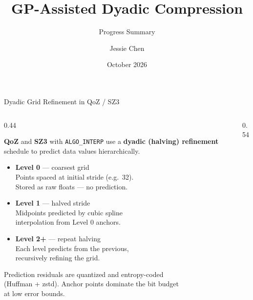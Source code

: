 \documentclass[aspectratio=169, 10pt]{beamer}
\title{GP-Assisted Dyadic Compression}
\subtitle{Progress Summary}
\author{Jessie Chen}
\institute{Argonne National Laboratory}
\date{October 2026}
\begin{document}
\begin{frame}{Dyadic Grid Refinement in QoZ / SZ3}

\begin{columns}[T, totalwidth=\textwidth]
\begin{column}{0.44\textwidth}
  {\footnotesize
  \textbf{QoZ} and \textbf{SZ3} with \texttt{ALGO\_INTERP} use a
  \textbf{dyadic (halving) refinement} schedule to predict data values
  hierarchically.

  \medskip
  \begin{itemize}\setlength\itemsep{3pt}
    \item[\textcolor{cnavy}{\textbullet}]
      \textbf{Level 0} — coarsest grid\\
      {\scriptsize Points spaced at initial stride (e.g.\ 32).\\
       Stored as raw floats — no prediction.}
    \item[\textcolor{cteal}{\textbullet}]
      \textbf{Level 1} — halved stride\\
      {\scriptsize Midpoints predicted by cubic spline\\
       interpolation from Level 0 anchors.}
    \item[\textcolor{cmid}{\textbullet}]
      \textbf{Level 2+} — repeat halving\\
      {\scriptsize Each level predicts from the previous,\\
       recursively refining the grid.}
  \end{itemize}

  \medskip
  {\scriptsize\color{cmuted}
  Prediction residuals are quantized and entropy-coded\\
  (Huffman + zstd).  Anchor points dominate the bit budget\\
  at low error bounds.}
  }
\end{column}

\begin{column}{0.54\textwidth}
\centering
{}
\end{column}
\end{columns}
\end{frame}
\end{document}
